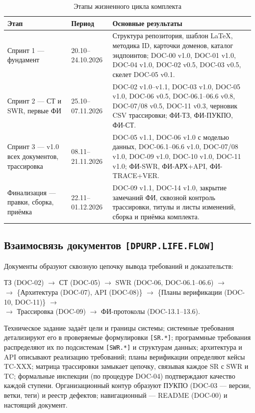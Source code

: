 \documentclass[12pt,a4paper]{article}
\begin{document}
\begin{table}[h!]
    \centering
    \caption{Этапы жизненного цикла комплекта}
    \label{tab:life-sprints}
    \begin{tabularx}{\textwidth}{p{3.2cm} p{2.6cm} X}
        \toprule
        \textbf{Этап} & \textbf{Период} & \textbf{Основные результаты} \\
        \midrule
        Спринт 1 — фундамент & 20.10--24.10.2026 & Структура репозитория, шаблон LaTeX, методика ID, карточки доменов, каталог эндпоинтов; DOC-00 v1.0, DOC-01 v1.0, DOC-04 v1.0, DOC-02 v0.5, DOC-03 v0.5, скелет DOC-05 v0.1. \\
        Спринт 2 — СТ и SWR, первые ФИ & 25.10--07.11.2026 & DOC-02 v1.0--v1.1, DOC-03 v1.0, DOC-05 v1.0, DOC-06 v0.5, DOC-06.1--06.6 v0.8, DOC-07/08 v0.5, DOC-11 v0.3, черновик CSV трассировки; ФИ-ТЗ, ФИ-ПУКПО, ФИ-СТ. \\
        Спринт 3 — v1.0 всех документов, трассировка & 08.11--21.11.2026 & DOC-05 v1.1, DOC-06 v1.0 с моделью данных, DOC-06.1--06.6 v1.0, DOC-07/08 v1.0, DOC-09 v1.0, DOC-10 v1.0, DOC-11 v1.0; ФИ-SWR, ФИ-АРХ+API, ФИ-TRACE+VER. \\
        Финализация — правки, сборка, приёмка & 22.11--01.12.2026 & DOC-09 v1.1, DOC-14 v1.0, закрытие замечаний ФИ, сквозной контроль трассировки, титулы и листы изменений, сборка и приёмка комплекта. \\
        \bottomrule
    \end{tabularx}
\end{table}

\subsection{Взаимосвязь документов \texttt{[DPURP.LIFE.FLOW]}}
Документы образуют сквозную цепочку вывода требований и доказательств:

\begin{center}
ТЗ (DOC-02) $\rightarrow$ СТ (DOC-05) $\rightarrow$ SWR (DOC-06, DOC-06.1--06.6) $\rightarrow$ \\
$\rightarrow$ \{Архитектура (DOC-07), API (DOC-08)\} $\rightarrow$ \{Планы верификации (DOC-10, DOC-11)\} $\rightarrow$ \\
$\rightarrow$ Трассировка (DOC-09) $\rightarrow$ ФИ-протоколы (DOC-13.1--13.6).
\end{center}

Техническое задание задаёт цели и границы системы; системные требования детализируют
его в проверяемые формулировки \texttt{[SR.*]}; программные требования распределяют
их по подсистемам \texttt{[SWR.*]} и структурам данных; архитектура и API описывают
реализацию требований; планы верификации определяют кейсы TC-XXX; матрица
трассировки замыкает цепочку, связывая каждое SR с SWR и TC; формальные инспекции
(по процедуре DOC-04) подтверждают качество каждой ступени. Организационный контур
образуют ПУКПО (DOC-03 — версии, ветки, теги) и реестр дефектов; навигационный —
README (DOC-00) и настоящий документ.
\end{document}

